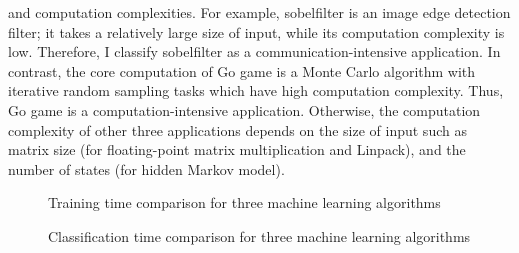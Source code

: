 {{and computation complexities.
%
For example, sobelfilter is an image edge detection filter; it
takes a relatively large size of input, while its computation complexity
is low.
%
Therefore, I classify sobelfilter as a communication-intensive
application.
%
In contrast, the core computation of Go game is a Monte Carlo
algorithm with iterative random sampling tasks which have high
computation complexity.
%
Thus, Go game is a computation-intensive application.
%
Otherwise, the computation complexity of other three applications
depends on the size of input such as matrix size (for floating-point matrix
multiplication and Linpack), and the number of states (for hidden Markov
model).
%
\begin{figure}
\centering
{}
\caption{Training time comparison for three machine learning algorithms}
\label{fig:training}
\end{figure}
%
\begin{figure}
\centering
{}
\caption{Classification time comparison for three machine learning algorithms}
\label{fig:classification}
\end{figure}
%

}}

